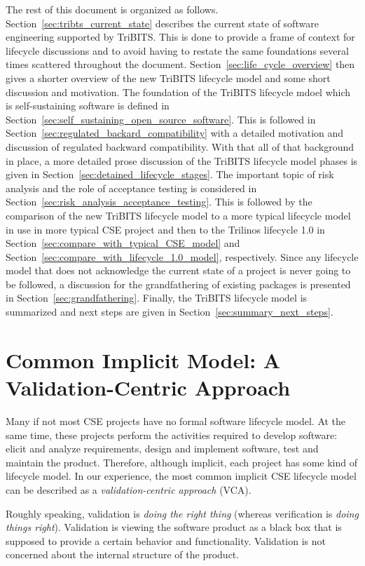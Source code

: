 \documentclass[11pt]{SANDreport}
\begin{document}
The rest of this document is organized as follows.
Section~\ref{sec:tribts_current_state} describes the current state of
software engineering supported by TriBITS.  This is done to provide a
frame of context for lifecycle discussions and to avoid having to
restate the same foundations several times scattered throughout the
document.  Section~\ref{sec:life_cycle_overview} then gives a shorter
overview of the new TriBITS lifecycle model and some short discussion
and motivation.  The foundation of the TriBITS lifecycle mdoel which
is self-sustaining software is defined in
Section~\ref{sec:self_sustaining_open_source_software}.  This is
followed in Section~\ref{sec:regulated_backard_compatibility} with a
detailed motivation and discussion of regulated backward
compatibility.  With that all of that background in place, a more
detailed prose discussion of the TriBITS lifecycle model phases is
given in Section~\ref{sec:detained_lifecycle_stages}.  The important
topic of risk analysis and the role of acceptance testing is
considered in Section~\ref{sec:risk_analysis_acceptance_testing}.
This is followed by the comparison of the new TriBITS lifecycle model
to a more typical lifecycle model in use in more typical CSE project
and then to the Trilinos lifecycle 1.0 in
Section~\ref{sec:compare_with_typical_CSE_model} and
Section~\ref{sec:compare_with_lifecycle_1.0_model}, respectively.
Since any lifecycle model that does not acknowledge the current state
of a project is never going to be followed, a discussion for the
grandfathering of existing packages is presented in
Section~\ref{sec:grandfathering}.  Finally, the TriBITS lifecycle
model is summarized and next steps are given in
Section~\ref{sec:summary_next_steps}.

%
{}\section {Common Implicit Model: A Validation-Centric Approach}
\label{sect:validation_centric_approach}

Many if not most CSE projects have no formal software lifecycle model.  At the same time, these projects perform the activities required to develop software: elicit and analyze requirements, design and implement software, test and maintain the product.  Therefore, although implicit, each project has some kind of lifecycle model.  In our experience, the most common implicit CSE lifecycle model can be described as a {\it validation-centric approach} (VCA).  

Roughly speaking, validation is {\it doing the right thing} (whereas verification is {\it doing things right}).  Validation is viewing the software product as a black box that is supposed to provide a certain behavior and functionality.  Validation is not concerned about the internal structure of the product.
\end{document}

